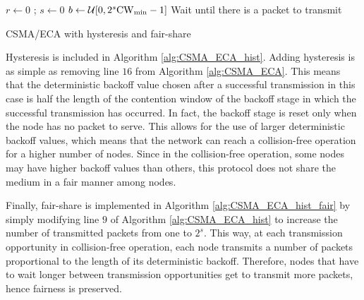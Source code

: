 \documentclass[conference]{IEEEtran}
\begin{document}
\begin{algorithm}[ht!!!]
{
  $r \leftarrow 0$ ; $s \leftarrow 0$\;
  $b \leftarrow \mathcal{U}[0,2^s\rm{CW}_{min}-1]$\;
  Wait until there is a packet to transmit\;
}
\vspace{0.2cm}
\caption{CSMA/ECA with hysteresis and fair-share}
\label{alg:CSMA_ECA_hist_fair}
\end{algorithm}

Hysteresis is included in Algorithm \ref{alg:CSMA_ECA_hist}. Adding hysteresis is as simple as removing line $16$ from Algorithm \ref{alg:CSMA_ECA}. This means that the deterministic backoff value chosen after a successful transmission in this case is half the length of the contention window of the backoff stage in which the successful transmission has occurred. In fact, the backoff stage is reset only when the node has no packet to serve. This allows for the use of larger deterministic backoff values, which means that the network can reach a collision-free operation for a higher number of nodes. Since in the collision-free operation, some nodes may have higher backoff values than others, this protocol does not share the medium in a fair manner among nodes.

Finally, fair-share is implemented in Algorithm \ref{alg:CSMA_ECA_hist_fair} by simply modifying
line $9$ of Algorithm \ref{alg:CSMA_ECA_hist} to increase the number of transmitted packets from one to $2^s$. This way, at each transmission opportunity in collision-free operation, each node transmits a number of packets proportional to the length of its deterministic backoff. Therefore, nodes that have to wait longer between transmission opportunities get to transmit more packets, hence fairness is preserved.
\end{document}
